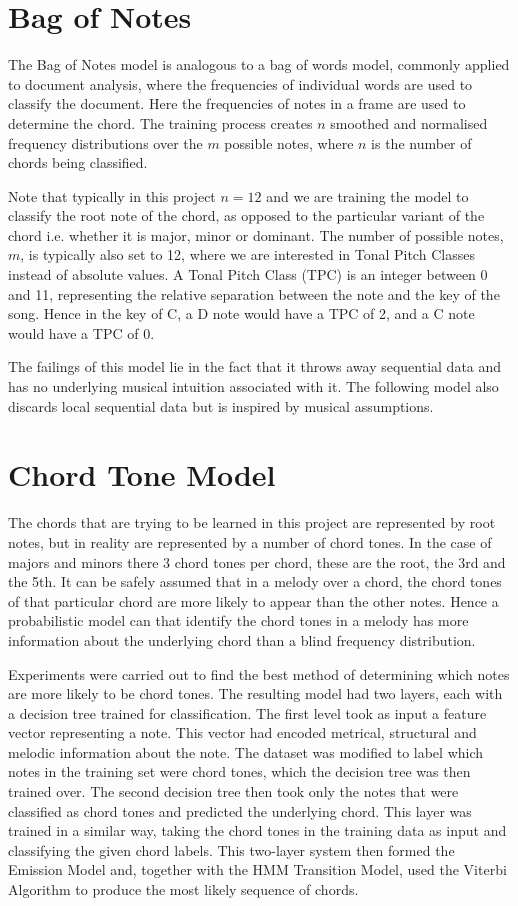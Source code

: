 \documentclass[bsc,singlespacing,parskip, deptreport]{infthesis}
\begin{document}
\section{Bag of Notes}

The Bag of Notes model is analogous to a bag of words model, commonly applied to document analysis, where the frequencies of individual words are used to classify the document. Here the frequencies of notes in a frame are used to determine the chord. The training process creates $n$ smoothed and normalised frequency distributions over the $m$ possible notes, where $n$ is the number of chords being classified. 

Note that typically in this project $n = 12$ and we are training the model to classify the root note of the chord, as opposed to the particular variant of the chord i.e. whether it is major, minor or dominant. The number of possible notes, $m$, is typically also set to 12, where we are interested in Tonal Pitch Classes instead of absolute values. A Tonal Pitch Class (TPC) is an integer between 0 and 11, representing the relative separation between the note and the key of the song. Hence in the key of C, a D note would have a TPC of 2, and a C note would have a TPC of 0.

The failings of this model lie in the fact that it throws away sequential data and has no underlying musical intuition associated with it. The following model also discards local sequential data but is inspired by musical assumptions.

\section{Chord Tone Model}

The chords that are trying to be learned in this project are represented by root notes, but in reality are represented by a number of chord tones. In the case of majors and minors there 3 chord tones per chord, these are the root, the 3rd and the 5th. It can be safely assumed that in a melody over a chord, the chord tones of that particular chord are more likely to appear than the other notes. Hence a probabilistic model can that identify the chord tones in a melody has more information about the underlying chord than a blind frequency distribution.

Experiments were carried out to find the best method of determining which notes are more likely to be chord tones. The resulting model had two layers, each with a decision tree trained for classification. The first level took as input a feature vector representing a note. This vector had encoded metrical, structural and melodic information about the note. The dataset was modified to label which notes in the training set were chord tones, which the decision tree was then trained over. The second decision tree then took only the notes that were classified as chord tones and predicted the underlying chord. This layer was trained in a similar way, taking the chord tones in the training data as input and classifying the given chord labels. This two-layer system then formed the Emission Model and, together with the HMM Transition Model, used the Viterbi Algorithm to produce the most likely sequence of chords.
\end{document}
